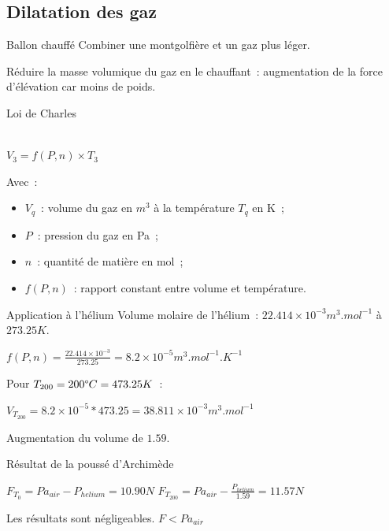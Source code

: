 \subsection{Dilatation des gaz}

\begin{frame}{Ballon chauffé}
	Combiner une montgolfière et un gaz plus léger.
	
	Réduire la masse volumique du gaz en le chauffant~: augmentation de la force d'élévation car moins de poids.
\end{frame}



\begin{frame}{Loi de Charles}
  \begin{center}
     \\
    $\displaystyle{V_3 = f(P, n) \times T_3}$
  \end{center}
  Avec~:
  \begin{itemize}
    \item $V_q$~: volume du gaz en $m^3$ à la température $T_q$ en K~;
    \item $P$~: pression du gaz en Pa~;
    \item $n$~: quantité de matière en mol~;
    \item $f(P, n)$~: rapport constant entre volume et température.
  \end{itemize}
\end{frame}

\begin{frame}{Application à l'hélium}
  Volume molaire de l'hélium~: $22.414\times 10^{-3} m^3.mol^{-1}$ à $273.25K$.
  \begin{center}
    $\displaystyle{f(P, n) = \frac{22.414\times 10^{-3}}{273.25} = 8.2\times 10^{-5} m^3.mol^{-1}.K^{-1}}$
  \end{center}
  Pour $T_{200} = 200 \degree C = 473.25 K$~:
  \begin{center}
    $\displaystyle{V_{T_{200}} = 8.2\times 10^{-5} * 473.25 = 38.811 \times 10^{-3}} m^3.mol^{-1}$
  \end{center}
  Augmentation du volume de $1.59$.
\end{frame}

\begin{frame}{Résultat de la poussé d'Archimède}
  \begin{center}
    $\displaystyle{F_{T_0} = Pa_{air} - P_{helium} = 10.90 N}$
    \bigbreak
    $\displaystyle{F_{T_{200}} = Pa_{air} - \frac{P_{helium}}{1.59} = 11.57 N}$ \\
  \end{center}
  Les résultats sont négligeables. $F < Pa_{air}$
\end{frame}


